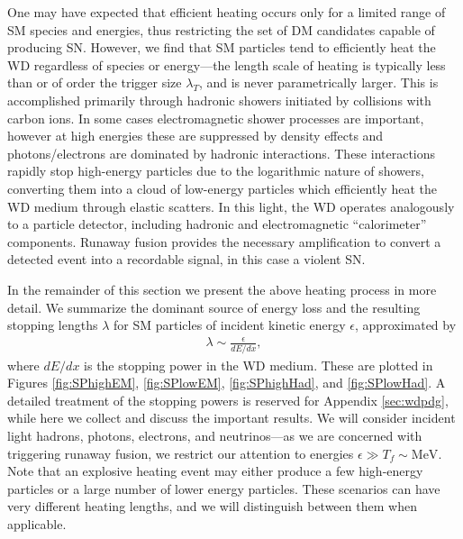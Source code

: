 \documentclass[twocolumn, preprintnumbers,amsmath,amssymb,prd, superscriptaddress]{revtex4}
\begin{document}
One may have expected that efficient heating occurs only for a limited range of SM species and energies, thus restricting the set of DM candidates capable of producing SN.
However, we find that SM particles tend to efficiently heat the WD regardless of species or energy---the length scale of heating is typically less than or of order the trigger size $\lambda_T$, and is never parametrically larger.
This is accomplished primarily through hadronic showers initiated by collisions with carbon ions.
In some cases electromagnetic shower processes are important, however at high energies these are suppressed by density effects and photons/electrons are dominated by hadronic interactions.
These interactions rapidly stop high-energy particles due to the logarithmic nature of showers, converting them into a cloud of low-energy particles which efficiently heat the WD medium through elastic scatters.
In this light, the WD operates analogously to a particle detector, including hadronic and electromagnetic ``calorimeter'' components.
Runaway fusion provides the necessary amplification to convert a detected event into a recordable signal, in this case a violent SN.

In the remainder of this section we present the above heating process in more detail.
We summarize the dominant source of energy loss and the resulting stopping lengths $\lambda$ for SM particles of incident kinetic energy $\epsilon$, approximated by
\begin{align}
    \lambda \sim \frac{\epsilon}{dE/dx},
\end{align}
where $dE/dx$ is the stopping power in the WD medium.
These are plotted in Figures \ref{fig:SPhighEM}, \ref{fig:SPlowEM}, \ref{fig:SPhighHad}, and \ref{fig:SPlowHad}.
A detailed treatment of the stopping powers is reserved for Appendix \ref{sec:wdpdg}, while here we collect and discuss the important results.
We will consider incident light hadrons, photons, electrons, and neutrinos---as we are concerned with triggering runaway fusion, we restrict our attention to energies $\epsilon \gg T_f \sim \text{MeV}$.
Note that an explosive heating event may either produce a few high-energy particles or a large number of lower energy particles.
These scenarios can have very different heating lengths, and we will distinguish between them when applicable.
\end{document}
